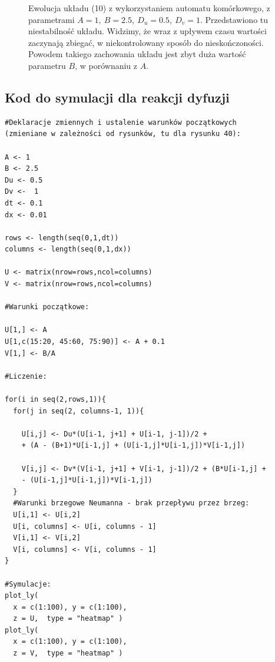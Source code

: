 \documentclass[a4paper,12pt]{article}
\begin{document}
\begin{figure}[h]
\centering
{}
\quad
{}
\caption{Ewolucja układu (10) z wykorzystaniem automatu komórkowego, z parametrami $A=1,\ B=2.5,\ D_u=0.5,\ D_v=1$. Przedstawiono tu niestabilność układu. Widzimy, że wraz z upływem czasu wartości zaczynają zbiegać, w niekontrolowany sposób do nieskończoności. Powodem takiego zachowania układu jest zbyt duża wartość parametru $B$, w porównaniu z $A$.}
\label{fig:animals}
\end{figure}

\newpage
\subsection{Kod do symulacji dla reakcji dyfuzji}

\begin{verbatim}    
#Deklaracje zmiennych i ustalenie warunków początkowych 
(zmieniane w zależności od rysunków, tu dla rysunku 40):

A <- 1 
B <- 2.5 
Du <- 0.5
Dv <-  1 
dt <- 0.1
dx <- 0.01  

rows <- length(seq(0,1,dt))
columns <- length(seq(0,1,dx))

U <- matrix(nrow=rows,ncol=columns)
V <- matrix(nrow=rows,ncol=columns)

#Warunki początkowe:

U[1,] <- A 
U[1,c(15:20, 45:60, 75:90)] <- A + 0.1
V[1,] <- B/A

#Liczenie:

for(i in seq(2,rows,1)){
  for(j in seq(2, columns-1, 1)){
  
    U[i,j] <- Du*(U[i-1, j+1] + U[i-1, j-1])/2 +
    + (A - (B+1)*U[i-1,j] + (U[i-1,j]*U[i-1,j])*V[i-1,j])
    
    V[i,j] <- Dv*(V[i-1, j+1] + V[i-1, j-1])/2 + (B*U[i-1,j] + 
    - (U[i-1,j]*U[i-1,j])*V[i-1,j])
  }
  #Warunki brzegowe Neumanna - brak przepływu przez brzeg:
  U[i,1] <- U[i,2]
  U[i, columns] <- U[i, columns - 1]
  V[i,1] <- V[i,2]
  V[i, columns] <- V[i, columns - 1]
}

#Symulacje:
plot_ly(
  x = c(1:100), y = c(1:100),
  z = U,  type = "heatmap" )
plot_ly(
  x = c(1:100), y = c(1:100),
  z = V,  type = "heatmap" )
\end{verbatim}
\end{document}
